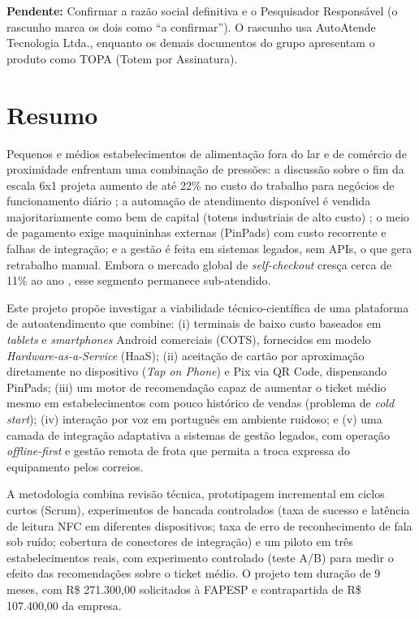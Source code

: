 \documentclass[12pt,a4paper]{article}
\newcommand{\pendente}[1]{\begin{pendbox}\textbf{\color{pendfg}Pendente:} #1\end{pendbox}}
\begin{document}
\pendente{Confirmar a razão social definitiva e o Pesquisador Responsável (o rascunho marca os dois como ``a confirmar''). O rascunho usa AutoAtende Tecnologia Ltda., enquanto os demais documentos do grupo apresentam o produto como TOPA (Totem por Assinatura).}

\section{Resumo}

Pequenos e médios estabelecimentos de alimentação fora do lar e de comércio de proximidade enfrentam uma combinação de pressões: a discussão sobre o fim da escala 6x1 projeta aumento de até 22\% no custo do trabalho para negócios de funcionamento diário \cite{fecomercio2026, abrasel2026}; a automação de atendimento disponível é vendida majoritariamente como bem de capital (totens industriais de alto custo) \cite{genialtec2026}; o meio de pagamento exige maquininhas externas (PinPads) com custo recorrente e falhas de integração; e a gestão é feita em sistemas legados, sem APIs, o que gera retrabalho manual. Embora o mercado global de \textit{self-checkout} cresça cerca de 11\% ao ano \cite{pegn2026}, esse segmento permanece sub-atendido.

Este projeto propõe investigar a viabilidade técnico-científica de uma plataforma de autoatendimento que combine: (i) terminais de baixo custo baseados em \textit{tablets} e \textit{smartphones} Android comerciais (COTS), fornecidos em modelo \textit{Hardware-as-a-Service} (HaaS); (ii) aceitação de cartão por aproximação diretamente no dispositivo (\textit{Tap on Phone}) e Pix via QR Code, dispensando PinPads; (iii) um motor de recomendação capaz de aumentar o ticket médio mesmo em estabelecimentos com pouco histórico de vendas (problema de \textit{cold start}); (iv) interação por voz em português em ambiente ruidoso; e (v) uma camada de integração adaptativa a sistemas de gestão legados, com operação \textit{offline-first} e gestão remota de frota que permita a troca expressa do equipamento pelos correios.

A metodologia combina revisão técnica, prototipagem incremental em ciclos curtos (Scrum), experimentos de bancada controlados (taxa de sucesso e latência de leitura NFC em diferentes dispositivos; taxa de erro de reconhecimento de fala sob ruído; cobertura de conectores de integração) e um piloto em três estabelecimentos reais, com experimento controlado (teste A/B) para medir o efeito das recomendações sobre o ticket médio. O projeto tem duração de 9 meses, com R\$ 271.300,00 solicitados à FAPESP e contrapartida de R\$ 107.400,00 da empresa.
\end{document}
